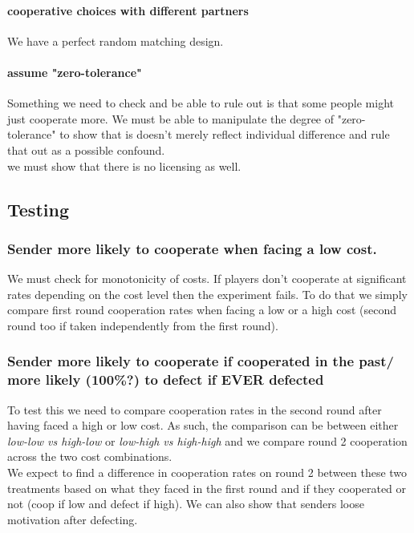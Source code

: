 \documentclass[11pt]{article}
\theoremstyle{plainCl1}
\begin{document}
\paragraph{cooperative choices with different partners}
We have a perfect random matching design. 

\paragraph{assume "zero-tolerance" }
Something we need to check and be able to rule out is that some people might just cooperate more. 
We must be able to manipulate the degree of "zero-tolerance" to show that is doesn't merely reflect individual difference and rule that out as a possible confound. \\
we must show that there is no licensing as well. 

\subsection{Testing}

\subsubsection{Sender more likely to cooperate when facing a low cost.}
We must check for monotonicity of costs. If players don't cooperate at significant rates depending on the cost level then the experiment fails. 
To do that we simply compare first round cooperation rates when facing a low or a high cost (second round too if taken independently from the first round). \\

\subsubsection{Sender more likely to cooperate if cooperated in the past/ \\ more likely (100\%?) to defect if EVER defected} 
To test this we need to compare cooperation rates in the second round after having faced a high or low cost. 
As such, the comparison can be between either \textsl{low-low vs high-low} or \textsl{low-high vs high-high} and we compare round 2 cooperation across the two cost combinations. \\ 
We expect to find a difference in cooperation rates on round 2 between these two treatments based on what they faced in the first round and if they cooperated or not (coop if low 			and defect if high). We can also show that senders loose motivation after defecting. \\
\end{document}
